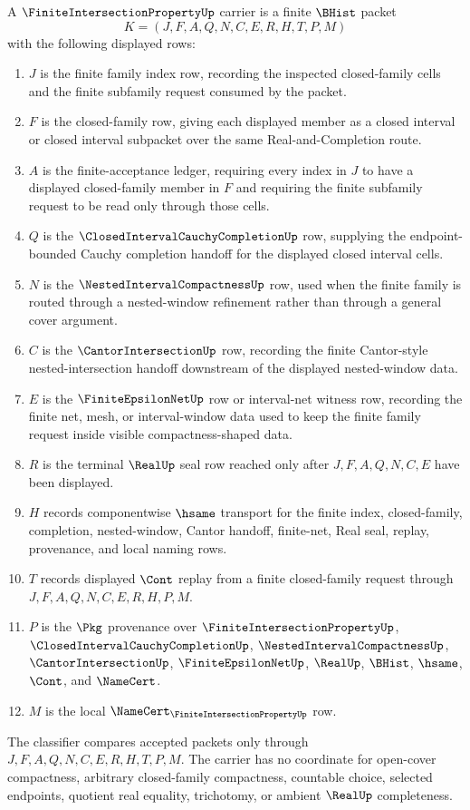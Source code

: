 \begin{definition}
\label{def:finite-intersection-property-carrier}
A $\FiniteIntersectionPropertyUp$ carrier is a finite $\BHist$ packet
$$
K=(J,F,A,Q,N,C,E,R,H,T,P,M)
$$
with the following displayed rows:
\begin{enumerate}
\item $J$ is the finite family index row, recording the inspected closed-family cells and the finite subfamily request consumed by the packet.
\item $F$ is the closed-family row, giving each displayed member as a closed interval or closed interval subpacket over the same Real-and-Completion route.
\item $A$ is the finite-acceptance ledger, requiring every index in $J$ to have a displayed closed-family member in $F$ and requiring the finite subfamily request to be read only through those cells.
\item $Q$ is the $\ClosedIntervalCauchyCompletionUp$ row, supplying the endpoint-bounded Cauchy completion handoff for the displayed closed interval cells.
\item $N$ is the $\NestedIntervalCompactnessUp$ row, used when the finite family is routed through a nested-window refinement rather than through a general cover argument.
\item $C$ is the $\CantorIntersectionUp$ row, recording the finite Cantor-style nested-intersection handoff downstream of the displayed nested-window data.
\item $E$ is the $\FiniteEpsilonNetUp$ row or interval-net witness row, recording the finite net, mesh, or interval-window data used to keep the finite family request inside visible compactness-shaped data.
\item $R$ is the terminal $\RealUp$ seal row reached only after $J,F,A,Q,N,C,E$ have been displayed.
\item $H$ records componentwise $\hsame$ transport for the finite index, closed-family, completion, nested-window, Cantor handoff, finite-net, Real seal, replay, provenance, and local naming rows.
\item $T$ records displayed $\Cont$ replay from a finite closed-family request through $J,F,A,Q,N,C,E,R,H,P,M$.
\item $P$ is the $\Pkg$ provenance over $\FiniteIntersectionPropertyUp$, $\ClosedIntervalCauchyCompletionUp$, $\NestedIntervalCompactnessUp$, $\CantorIntersectionUp$, $\FiniteEpsilonNetUp$, $\RealUp$, $\BHist$, $\hsame$, $\Cont$, and $\NameCert$.
\item $M$ is the local $\NameCert_{\FiniteIntersectionPropertyUp}$ row.
\end{enumerate}
The classifier compares accepted packets only through $J,F,A,Q,N,C,E,R,H,T,P,M$. The carrier has no coordinate for open-cover compactness, arbitrary closed-family compactness, countable choice, selected endpoints, quotient real equality, trichotomy, or ambient $\RealUp$ completeness.
\end{definition}

